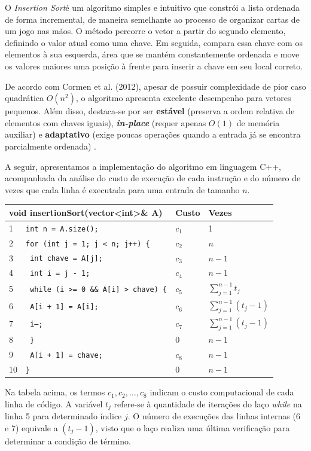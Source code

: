 
\qquad O \textit{Insertion Sort}é um algoritmo simples e intuitivo que constrói a lista ordenada de forma incremental, de maneira semelhante ao processo de organizar cartas de um jogo nas mãos. O método percorre o vetor a partir do segundo elemento, definindo o valor atual como uma chave. Em seguida, compara essa chave com os elementos à sua esquerda, área que se mantém constantemente ordenada e move os valores maiores uma posição à frente para inserir a chave em seu local correto.

\qquad De acordo com Cormen et al. (2012), apesar de possuir complexidade de pior caso quadrática $O(n^2)$, o algoritmo apresenta excelente desempenho para vetores pequenos. Além disso, destaca-se por ser \textbf{estável} (preserva a ordem relativa de elementos com chaves iguais), \textit{\textbf{in-place}} (requer apenas $O(1)$ de memória auxiliar) e \textbf{adaptativo} (exige poucas operações quando a entrada já se encontra parcialmente ordenada) \cite{cormen}.

\qquad A seguir, apresentamos a implementação do algoritmo em linguagem C++, acompanhada da análise do custo de execução de cada instrução e do número de vezes que cada linha é executada para uma entrada de tamanho $n$.

\vspace{1cm}

\begin{center}
\begin{tabular}{l l l l}
\hline
\multicolumn{2}{l}{\textbf{void insertionSort(vector<int>\& A)}} & \textbf{Custo} & \textbf{Vezes} \\
\hline
1 & \texttt{int n = A.size();} & $c_1$ & 1 \\
2 & \texttt{for (int j = 1; j < n; j++) \{} & $c_2$ & $n$ \\
3 & \texttt{    int chave = A[j];} & $c_3$ & $n-1$ \\
4 & \texttt{    int i = j - 1;} & $c_4$ & $n-1$ \\
5 & \texttt{    while (i >= 0 \&\& A[i] > chave) \{} & $c_5$ & $\sum_{j=1}^{n-1} t_j$ \\
6 & \texttt{        A[i + 1] = A[i];} & $c_6$ & $\sum_{j=1}^{n-1} (t_j-1)$ \\
7 & \texttt{        i--;} & $c_7$ & $\sum_{j=1}^{n-1} (t_j-1)$ \\
8 & \texttt{    \}} & 0 & $n-1$ \\
9 & \texttt{    A[i + 1] = chave;} & $c_8$ & $n-1$ \\
10 & \texttt{\}} & 0 & $n-1$ \\
\hline
\end{tabular}
\end{center}

\vspace{1cm}

\qquad Na tabela acima, os termos $c_1, c_2, \dots, c_8$ indicam o custo computacional de cada linha de código. A variável $t_j$ refere-se à quantidade de iterações do laço \textit{while} na linha 5 para determinado índice $j$. O número de execuções das linhas internas (6 e 7) equivale a $(t_j - 1)$, visto que o laço realiza uma última verificação para determinar a condição de término.